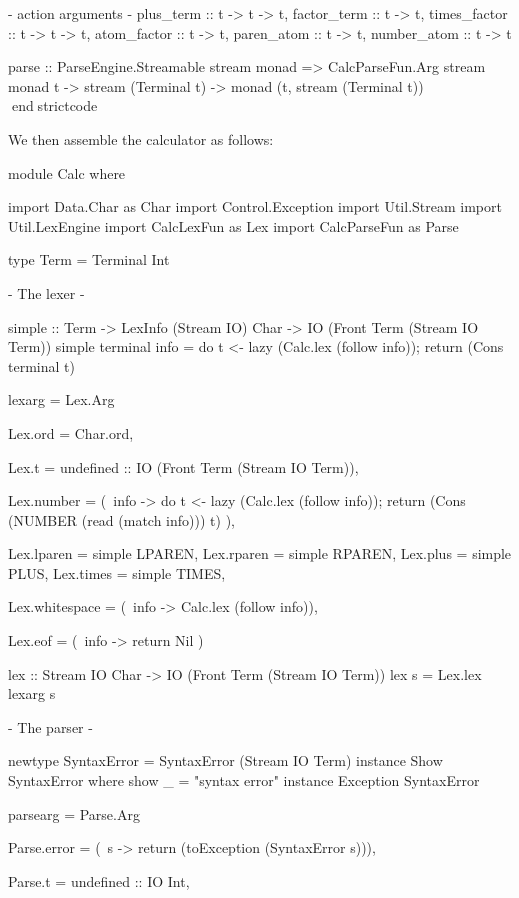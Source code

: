 \documentclass[10pt]{article}
\begin{document}
\begin{strictcode}
\begin{strictcode}
\begin{strictcode}
\begin{strictcode}
\begin{strictcode}
\begin{strictcode}
\begin{strictcode}
\begin{strictcode}
\begin{strictcode}
\begin{bigstrictcode}
\begin{strictcode}
\begin{strictcode}
{         {- action arguments -}
         plus_term :: t -> t -> t,
         factor_term :: t -> t,
         times_factor :: t -> t -> t,
         atom_factor :: t -> t,
         paren_atom :: t -> t,
         number_atom :: t -> t }

parse :: ParseEngine.Streamable stream monad 
         => CalcParseFun.Arg stream monad t -> stream (Terminal t)
               -> monad (t, stream (Terminal t))
endstrictcode

We then assemble the calculator as follows:

\begin{bigstrictcode}
module Calc where

import Data.Char as Char
import Control.Exception
import Util.Stream
import Util.LexEngine
import CalcLexFun as Lex
import CalcParseFun as Parse

type Term = Terminal Int


{- The lexer -}

simple :: Term -> LexInfo (Stream IO) Char -> IO (Front Term (Stream IO Term))
simple terminal info =
   do {
      t <- lazy (Calc.lex (follow info));
      return (Cons terminal t)
      }


lexarg =
   Lex.Arg
      {
      Lex.ord = Char.ord,

      Lex.t = undefined :: IO (Front Term (Stream IO Term)),

      Lex.number =
         (\ info ->
             do {
                t <- lazy (Calc.lex (follow info));
                return (Cons (NUMBER (read (match info))) t)
                }),

      Lex.lparen = simple LPAREN,
      Lex.rparen = simple RPAREN,
      Lex.plus = simple PLUS,
      Lex.times = simple TIMES,

      Lex.whitespace =
         (\ info -> Calc.lex (follow info)),

      Lex.eof =
         (\ info -> return Nil )
      }


lex :: Stream IO Char -> IO (Front Term (Stream IO Term))
lex s = Lex.lex lexarg s


{- The parser -}

newtype SyntaxError = SyntaxError (Stream IO Term)
instance Show SyntaxError where
   show _ = "syntax error"
instance Exception SyntaxError


parsearg =
   Parse.Arg
      {
      Parse.error =
         (\ s -> return (toException (SyntaxError s))),

      Parse.t = undefined :: IO Int,

}
\end{bigstrictcode}
\end{strictcode}
\end{strictcode}
\end{bigstrictcode}
\end{strictcode}
\end{strictcode}
\end{strictcode}
\end{strictcode}
\end{strictcode}
\end{strictcode}
\end{strictcode}
\end{strictcode}
\end{strictcode}
\end{document}
